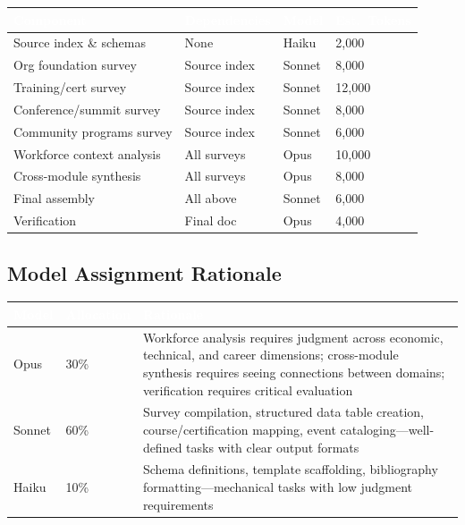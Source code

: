\documentclass[11pt,letterpaper]{article}
\newcommand{\tableheader}[1]{\textbf{\sffamily\textcolor{white}{#1}}}
\begin{document}
\begin{center}
\begin{tabularx}{\textwidth}{L{3.5cm}L{2cm}C{1.5cm}C{2cm}}
\toprule
{}
\tableheader{Component} & \tableheader{Dependencies} & \tableheader{Model} & \tableheader{Est.\ Tokens} \\
\midrule
Source index \& schemas & None & Haiku & 2,000 \\
Org foundation survey & Source index & Sonnet & 8,000 \\
Training/cert survey & Source index & Sonnet & 12,000 \\
Conference/summit survey & Source index & Sonnet & 8,000 \\
Community programs survey & Source index & Sonnet & 6,000 \\
Workforce context analysis & All surveys & Opus & 10,000 \\
Cross-module synthesis & All surveys & Opus & 8,000 \\
Final assembly & All above & Sonnet & 6,000 \\
Verification & Final doc & Opus & 4,000 \\
\bottomrule
\end{tabularx}
\end{center}

\subsection{Model Assignment Rationale}

\begin{center}
\begin{tabularx}{\textwidth}{C{1.5cm}C{1.5cm}X}
\toprule
{}
\tableheader{Model} & \tableheader{Allocation} & \tableheader{Rationale} \\
\midrule
Opus & 30\% & Workforce analysis requires judgment across economic, technical, and career dimensions; cross-module synthesis requires seeing connections between domains; verification requires critical evaluation \\
Sonnet & 60\% & Survey compilation, structured data table creation, course/certification mapping, event cataloging---well-defined tasks with clear output formats \\
Haiku & 10\% & Schema definitions, template scaffolding, bibliography formatting---mechanical tasks with low judgment requirements \\
\bottomrule
\end{tabularx}
\end{center}
\end{document}
